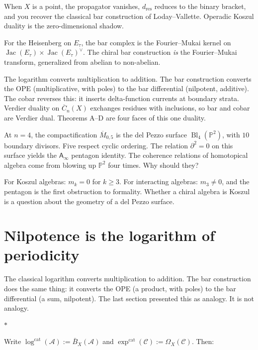 \documentclass[11pt]{article}
\newcommand{\cA}{\mathcal{A}}
\newcommand{\cC}{\mathcal{C}}
\newcommand{\B}{\bar{B}}
\newcommand{\bP}{\mathbb{P}}
\newcommand{\Ainf}{\mathsf{A}_{\infty}}
\DeclareMathOperator{\Bl}{Bl}
\DeclareMathOperator{\Jac}{Jac}
\newcommand{\sep}{\bigskip\begin{center}$*$\end{center}\medskip}
\begin{document}
When $X$ is a point, the propagator vanishes, $d_{\mathrm{res}}$
reduces to the binary bracket, and you recover the classical bar
construction of Loday--Vallette.  Operadic Koszul duality is the
zero-dimensional shadow.

For the Heisenberg on $E_\tau$, the bar complex is the
Fourier--Mukai kernel on $\Jac(E_\tau) \times \Jac(E_\tau)^\vee$.
The chiral bar construction \emph{is} the Fourier--Mukai transform,
generalized from abelian to non-abelian.

The logarithm converts multiplication to addition.  The bar
construction converts the OPE (multiplicative, with poles) to the
bar differential (nilpotent, additive).  The cobar reverses this:
it inserts delta-function currents at boundary strata.  Verdier
duality on $\overline{C}_n(X)$ exchanges residues with inclusions,
so bar and cobar are Verdier dual.  Theorems A--D are four faces of
this one duality.

At $n = 4$, the compactification $\overline{M}_{0,5}$ is the
del Pezzo surface $\Bl_4(\bP^2)$, with $10$ boundary divisors.
Five respect cyclic ordering.  The relation $\partial^2 = 0$ on
this surface yields the $\Ainf$ pentagon identity.  The coherence
relations of homotopical algebra come from blowing up
$\bP^2$ four times.  Why should they?

For Koszul algebras: $m_k = 0$ for $k \geq 3$.  For interacting
algebras: $m_3 \neq 0$, and the pentagon is the first obstruction
to formality.  Whether a chiral algebra is Koszul is a question
about the geometry of a del Pezzo surface.


\section{Nilpotence is the logarithm of periodicity}
\label{sec:nilpotence-log}

The classical logarithm converts multiplication to addition.  The
bar construction does the same thing: it converts the OPE (a product,
with poles) to the bar differential (a sum, nilpotent).  The
last section presented this as analogy.  It is not analogy.

\sep

Write $\log^{\mathrm{cat}}(\cA) := \B_X(\cA)$ and
$\exp^{\mathrm{cat}}(\cC) := \Omega_X(\cC)$.  Then:
\end{document}
